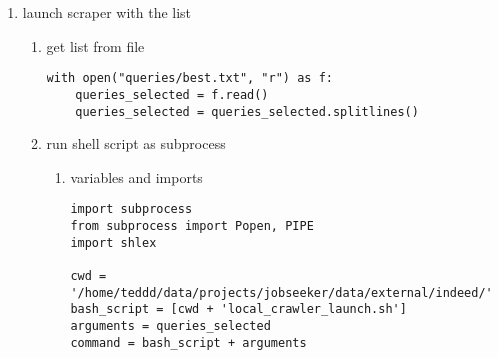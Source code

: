 \documentclass[11pt]{article}
\begin{document}
\begin{enumerate}
\begin{enumerate}
\begin{enumerate}
\begin{verbatim}
queries["entries"] = queries.path.apply(entries_count)
\end{verbatim}
\end{enumerate}

\item inspection
\label{sec:org1431e0e}
\begin{verbatim}
import humanize
queries["size_for_humans"] = queries["size"].apply(humanize.naturalsize)
queries.sort_values("size", ascending=False)[["name", "size_for_humans", "entries"]].reset_index()
\end{verbatim}

\item time evolution
\label{sec:org1e0a461}
\item return list for next scraper launch
\label{sec:org497a434}
\begin{enumerate}
\item remove null size results before (or not)
\label{sec:org646da0e}
\begin{verbatim}
queries_list = list(set(queries.name))
\end{verbatim}
\item save in a file for editing
\label{sec:orgc55e8dd}
\begin{verbatim}
with open("/queries/queries.txt", "w") as f:
    for query in queries_list:
	f.write(query + "\n")
\end{verbatim}
\end{enumerate}
\end{enumerate}
\item launch scraper with the list
\label{sec:org7165614}
\begin{enumerate}
\item get list from file
\label{sec:orgf1ae3d9}
\begin{verbatim}
with open("queries/best.txt", "r") as f:
    queries_selected = f.read()
    queries_selected = queries_selected.splitlines()
\end{verbatim}

\item run shell script as subprocess
\label{sec:orgb4bfbb2}
\begin{enumerate}
\item variables and imports
\label{sec:orgb356488}
\begin{verbatim}
import subprocess
from subprocess import Popen, PIPE
import shlex

cwd = '/home/teddd/data/projects/jobseeker/data/external/indeed/'
bash_script = [cwd + 'local_crawler_launch.sh']
arguments = queries_selected
command = bash_script + arguments
\end{verbatim}


\end{enumerate}
\end{enumerate}
\end{enumerate}
\end{document}
